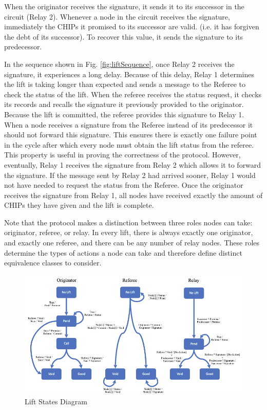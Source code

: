 \documentclass[runningheads]{llncs}
\begin{document}
When the originator receives the signature, it sends it to its successor in the circuit (Relay 2). Whenever a node in the circuit receives the signature, immediately the CHIPs it promised to its successor are valid. (i.e. it has forgiven the debt of its successor). 
To recover this value, it sends the signature to its predecessor.

In the sequence shown in Fig. \ref{fig:liftSequence}, once Relay 2 receives the signature, it experiences a long delay. Because of this delay, Relay 1 determines the lift is taking longer than expected and sends a message to the Referee to check the status of the lift. When the referee receives the status request, it checks its records and recalls the signature it previously provided to the originator. Because the lift is committed, the referee provides this signature to Relay 1. When a node receives a signature from the Referee instead of its predecessor it should not forward this signature. This ensures there is exactly one failure point in the cycle after which every node must obtain the lift status from the referee. This property is useful in proving the correctness of the protocol. However, eventually, Relay 1 receives the signature from Relay 2 which allows it to forward the signature. If the message sent by Relay 2 had arrived sooner, Relay 1 would not have needed to request the status from the Referee. Once the originator receives the signature from Relay 1, all nodes have received exactly the amount of CHIPs they have given and the lift is complete.

Note that the protocol makes a distinction between three roles nodes can take: originator, referee, or relay. In every lift, there is always exactly one originator, and exactly one referee, and there can be any number of relay nodes. These roles determine the types of actions a node can take and therefore define distinct equivalence classes to consider. 

\begin{figure}
    \centering
    \includegraphics[scale=0.42]{LiftStatesSeperate.png}
    \caption{Lift States Diagram}
    \label{fig:liftStates}
\end{figure}
\end{document}
